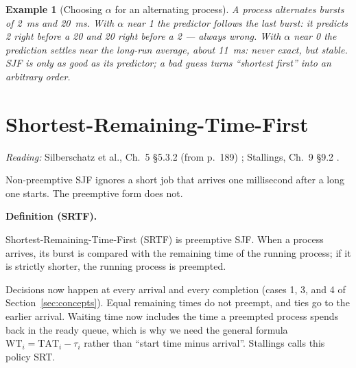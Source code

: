 \documentclass[11pt]{article}
\newtheorem{example}{Example}
\newenvironment{definitionbox}[1]{%
  \par\noindent\textbf{Definition (#1).}\ \itshape
}{\par\vspace{0.3em}}
\begin{document}
\begin{example}[Choosing $\alpha$ for an alternating process]
A process alternates bursts of 2~ms and 20~ms. With $\alpha$ near 1 the
predictor follows the last burst: it predicts 2 right before a 20 and 20 right
before a 2 --- always wrong. With $\alpha$ near 0 the prediction settles near
the long-run average, about 11~ms: never exact, but stable. SJF is only as good
as its predictor; a bad guess turns ``shortest first'' into an arbitrary order.
\end{example}

\section{Shortest-Remaining-Time-First}
\label{sec:srtf}

\noindent\emph{Reading:} Silberschatz et al., Ch.~5 \S5.3.2 (from p.~189)
\cite{SilberschatzOSC_operating_system_concepts}; Stallings, Ch.~9 \S9.2
\cite{StallingsOS_internals_design_principles}.

Non-preemptive SJF ignores a short job that arrives one millisecond after a long
one starts. The preemptive form does not.

\begin{definitionbox}{SRTF}
Shortest-Remaining-Time-First (SRTF) is preemptive SJF. When a process arrives,
its burst is compared with the remaining time of the running process; if it is
strictly shorter, the running process is preempted.
\end{definitionbox}

Decisions now happen at every arrival and every completion (cases 1, 3, and 4
of Section~\ref{sec:concepts}). Equal remaining times do not preempt, and ties
go to the earlier arrival. Waiting time now includes the time a preempted
process spends back in the ready queue, which is why we need the general
formula $\mathrm{WT}_i = \mathrm{TAT}_i - \tau_i$ rather than ``start time minus
arrival''. Stallings calls this policy SRT.
\end{document}
